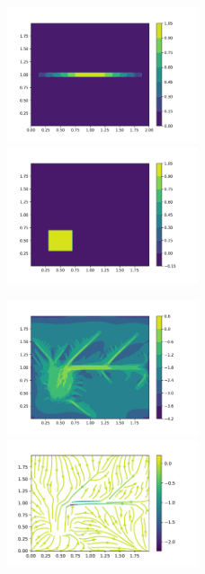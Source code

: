 \documentclass[letterpaper,12pt]{article}
\theoremstyle{plain}
\theoremstyle{remark}
\theoremstyle{remark}
\theoremstyle{remark}
\numberwithin{equation}{section}
\begin{document}
\begin{figure}
  \includegraphics[width=0.5\textwidth]{6/m1}
  \includegraphics[width=0.5\textwidth]{6/s}
\end{figure}
\begin{figure}
  \includegraphics[width=0.5\textwidth]{6/PCG}
  \includegraphics[width=0.5\textwidth]{6/vector}
\end{figure}
\end{document}
